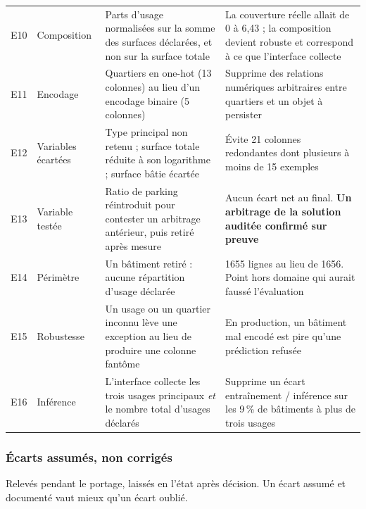 \begin{small}
\begin{longtable}{@{}p{0.7cm}p{2.5cm}p{5.2cm}p{5.4cm}@{}}
E10 & Composition & Parts d'usage normalisées sur la somme des surfaces déclarées, et non sur la surface totale & La couverture réelle allait de 0 à 6,43 ; la composition devient robuste et correspond à ce que l'interface collecte \\
E11 & Encodage & Quartiers en one-hot (13 colonnes) au lieu d'un encodage binaire (5 colonnes) & Supprime des relations numériques arbitraires entre quartiers et un objet à persister \\
E12 & Variables écartées & Type principal non retenu ; surface totale réduite à son logarithme ; surface bâtie écartée & Évite 21 colonnes redondantes dont plusieurs à moins de 15 exemples \\
E13 & Variable testée & Ratio de parking réintroduit pour contester un arbitrage antérieur, puis retiré après mesure & Aucun écart net au final. \textbf{Un arbitrage de la solution auditée confirmé sur preuve} \\
E14 & Périmètre & Un bâtiment retiré : aucune répartition d'usage déclarée & \num{1655} lignes au lieu de \num{1656}. Point hors domaine qui aurait faussé l'évaluation \\
E15 & Robustesse & Un usage ou un quartier inconnu lève une exception au lieu de produire une colonne fantôme & En production, un bâtiment mal encodé est pire qu'une prédiction refusée \\
E16 & Inférence & L'interface collecte les trois usages principaux \emph{et} le nombre total d'usages déclarés & Supprime un écart entraînement / inférence sur les 9\,\% de bâtiments à plus de trois usages \\
\end{longtable}
\end{small}

\subsubsection*{Écarts assumés, non corrigés}

Relevés pendant le portage, laissés en l'état après décision. Un écart assumé et
documenté vaut mieux qu'un écart oublié.

